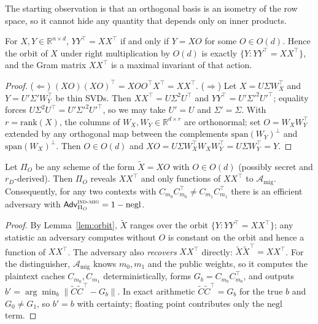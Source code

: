 The starting observation is that an orthogonal basis is an isometry of the row
space, so it cannot hide any quantity that depends only on inner products.

\begin{lemma}
\label{lem:orbit}
For $X,Y\in\mathbb{R}^{n\times d}$, $YY^\top=XX^\top$ if and only if $Y=XO$ for some
$O\in O(d)$. Hence the orbit of $X$ under right multiplication by $O(d)$ is exactly
$\{Y:YY^\top=XX^\top\}$, and the Gram matrix $XX^\top$ is a maximal invariant of
that action.
\end{lemma}

\begin{proof}
($\Leftarrow$) $(XO)(XO)^\top=XOO^\top X^\top=XX^\top$. ($\Rightarrow$) Let
$X=U\Sigma W_X^\top$ and $Y=U'\Sigma' W_Y^\top$ be thin SVDs. Then
$XX^\top=U\Sigma^2U^\top$ and $YY^\top=U'\Sigma'^2U'^\top$; equality forces
$U\Sigma^2U^\top=U'\Sigma'^2U'^\top$, so we may take $U'=U$ and $\Sigma'=\Sigma$.
With $r=\mathrm{rank}(X)$, the columns of $W_X,W_Y\in\mathbb{R}^{d\times r}$ are
orthonormal; set $O=W_XW_Y^\top$ extended by any orthogonal map between the
complements $\mathrm{span}(W_Y)^\perp$ and $\mathrm{span}(W_X)^\perp$. Then $O\in
O(d)$ and $XO=U\Sigma W_X^\top W_X W_Y^\top=U\Sigma W_Y^\top=Y$.
\end{proof}

\begin{theorem}
\label{thm:impossible}
Let $\Pi_O$ be any scheme of the form $\tilde X=XO$ with $O\in O(d)$ (possibly
secret and $r_D$-derived). Then $\Pi_O$ reveals $XX^\top$ and only functions of
$XX^\top$ to $\mathcal{A}_{\mathrm{mig}}$. Consequently, for any two contexts with
$C_{m_0}C_{m_0}^\top\neq C_{m_1}C_{m_1}^\top$ there is an efficient adversary with
$\mathsf{Adv}^{\textsc{ind-mig}}_{\Pi_O}=1-\mathrm{negl}$.
\end{theorem}

\begin{proof}
By Lemma~\ref{lem:orbit}, $\tilde X$ ranges over the orbit
$\{Y:YY^\top=XX^\top\}$; any statistic an adversary computes without $O$ is
constant on the orbit and hence a function of $XX^\top$. The adversary also
\emph{recovers} $XX^\top$ directly: $\tilde X\tilde X^\top=XX^\top$. For the
distinguisher, $\mathcal{A}_{\mathrm{mig}}$ knows $m_0,m_1$ and the public weights,
so it computes the plaintext caches $C_{m_0},C_{m_1}$ deterministically, forms
$G_b=C_{m_b}C_{m_b}^\top$, and outputs $b'=\arg\min_b\lVert\tilde C\tilde C^\top-G_b\rVert$.
In exact arithmetic $\tilde C\tilde C^\top=G_b$ for the true $b$ and
$G_0\neq G_1$, so $b'=b$ with certainty; floating point contributes only the
$\mathrm{negl}$ term.
\end{proof}

